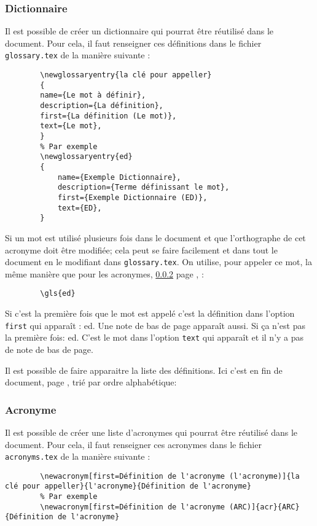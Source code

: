 \subsubsection{Dictionnaire} \label{dictionnaire}
Il est possible de créer un dictionnaire qui pourrat être réutilisé dans le document.
Pour cela, il faut renseigner ces définitions dans le fichier \verb=glossary.tex= de la manière suivante :
\begin{code}
    \begin{verbatim}
        \newglossaryentry{la clé pour appeller}
        {
        name={Le mot à définir},
        description={La définition},
        first={La définition (Le mot)},
        text={Le mot},
        }
        % Par exemple
        \newglossaryentry{ed}
        {
            name={Exemple Dictionnaire},
            description={Terme définissant le mot},
            first={Exemple Dictionnaire (ED)},
            text={ED},
        }
\end{verbatim}
    \caption{Définition dans le dictionnaire}
\end{code}

Si un mot est utilisé plusieurs fois dans le document et que l'orthographe de cet acronyme doit être modifiée;
cela peut se faire facilement et dans tout le document en le modifiant dans \verb=glossary.tex=.
On utilise, pour appeler ce mot, la même manière que pour les acronymes, \ref{acronyme} page \pageref{acronyme}, :
\begin{code}
    \begin{verbatim}
        \gls{ed}
\end{verbatim}
    \caption{Utilisation du dictionnaire}
\end{code}

Si c'est la première fois que le mot est appelé c'est la définition dans l'option \verb=first= qui apparaît : \gls{ed}.
Une note de bas de page apparaît aussi. \newline
Si ça n'est pas la première fois: \gls{ed}. C'est le mot dans l'option \verb=text= qui apparaît et il n'y a pas de note de bas de page.

Il est possible de faire apparaitre la liste des définitions. Ici c'est en fin de document,
page \pageref{dictionnaireDomaine}, trié par ordre alphabétique:

\subsubsection{Acronyme} \label{acronyme}
Il est possible de créer une liste d'acronymes qui pourrat être réutilisé dans le document.
Pour cela, il faut renseigner ces acronymes dans le fichier \verb=acronyms.tex= de la manière suivante :
\begin{code}
    \begin{verbatim}
        \newacronym[first=Définition de l'acronyme (l'acronyme)]{la clé pour appeller}{l'acronyme}{Définition de l'acronyme}
        % Par exemple
        \newacronym[first=Définition de l'acronyme (ARC)]{acr}{ARC}{Définition de l'acronyme}
\end{verbatim}
    \caption{Définition d'un acronyme}
\end{code}

